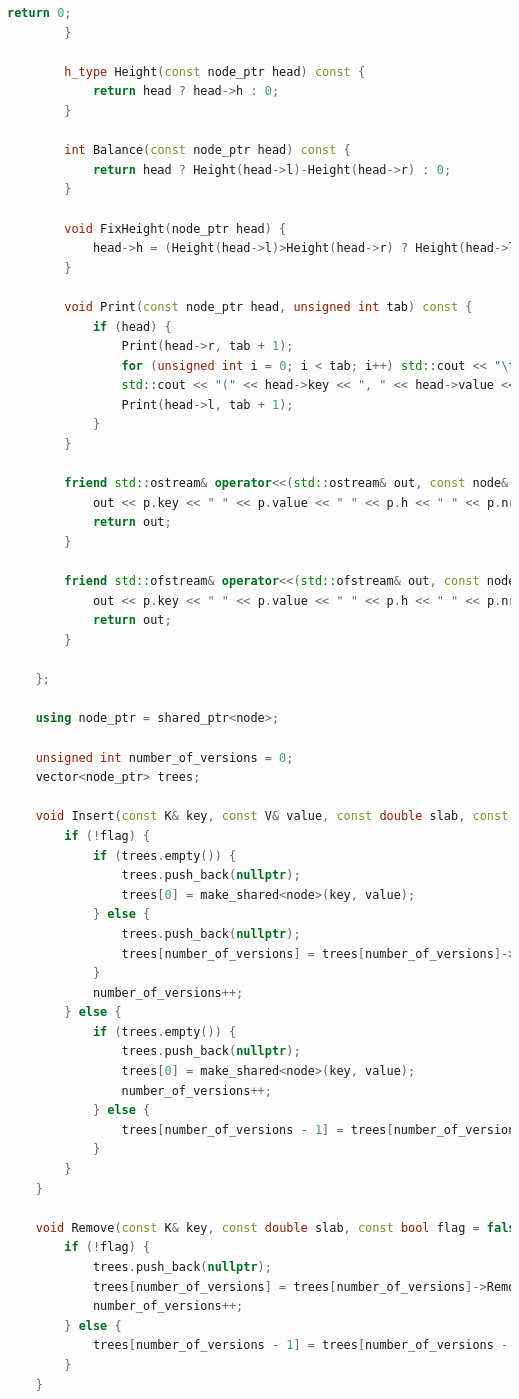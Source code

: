 \begin{lstlisting}[language=c++]
			return 0;
		}

		h_type Height(const node_ptr head) const {
			return head ? head->h : 0;
		}

		int Balance(const node_ptr head) const {
			return head ? Height(head->l)-Height(head->r) : 0;
		}

		void FixHeight(node_ptr head) {
			head->h = (Height(head->l)>Height(head->r) ? Height(head->l) : Height(head->r))+1;
		}

		void Print(const node_ptr head, unsigned int tab) const {
			if (head) {
				Print(head->r, tab + 1);
				for (unsigned int i = 0; i < tab; i++) std::cout << "\t";
				std::cout << "(" << head->key << ", " << head->value << ", " << head->h << ", " << head->nre << ", " << head->idx << ")\n";
				Print(head->l, tab + 1);
			}
		}

		friend std::ostream& operator<<(std::ostream& out, const node& p) {
			out << p.key << " " << p.value << " " << p.h << " " << p.nre << " " << p.idx;
			return out;
		}

		friend std::ofstream& operator<<(std::ofstream& out, const node& p) {
			out << p.key << " " << p.value << " " << p.h << " " << p.nre << " " << p.idx;
			return out;
		}

	};

	using node_ptr = shared_ptr<node>;

	unsigned int number_of_versions = 0;
	vector<node_ptr> trees;

	void Insert(const K& key, const V& value, const double slab, const bool flag = false) {
		if (!flag) {
			if (trees.empty()) {
				trees.push_back(nullptr);
				trees[0] = make_shared<node>(key, value);
			} else {
				trees.push_back(nullptr);
				trees[number_of_versions] = trees[number_of_versions]->Insert(trees[number_of_versions - 1], key, value, slab);
			}
			number_of_versions++;
		} else {
			if (trees.empty()) {
				trees.push_back(nullptr);
				trees[0] = make_shared<node>(key, value);
				number_of_versions++;
			} else {
				trees[number_of_versions - 1] = trees[number_of_versions - 1]->Insert(trees[number_of_versions - 1], key, value, slab);
			}
		}
	}

	void Remove(const K& key, const double slab, const bool flag = false) {
		if (!flag) {
			trees.push_back(nullptr);
			trees[number_of_versions] = trees[number_of_versions]->Remove(trees[number_of_versions - 1], key, slab);
			number_of_versions++;
		} else {
			trees[number_of_versions - 1] = trees[number_of_versions - 1]->Remove(trees[number_of_versions - 1], key, slab);
		}
	}


\end{lstlisting}
